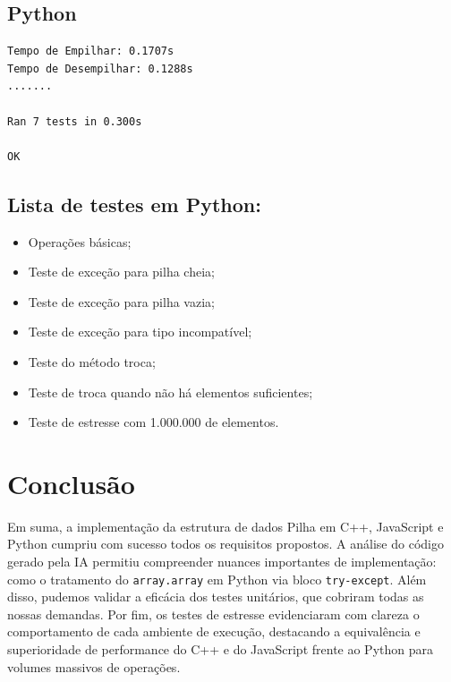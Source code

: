 \documentclass[12pt,a4paper]{article}
\begin{document}
\subsection*{Python}
\begin{verbatim}
Tempo de Empilhar: 0.1707s
Tempo de Desempilhar: 0.1288s
.......

Ran 7 tests in 0.300s

OK
\end{verbatim}

\subsection*{Lista de testes em Python:}
\begin{itemize}
    \item Operações básicas;
    \item Teste de exceção para pilha cheia;
    \item Teste de exceção para pilha vazia;
    \item Teste de exceção para tipo incompatível;
    \item Teste do método troca;
    \item Teste de troca quando não há elementos suficientes;
    \item Teste de estresse com 1.000.000 de elementos.
\end{itemize}


\section{Conclusão}

Em suma, a implementação da estrutura de dados Pilha em C++, JavaScript e Python cumpriu com sucesso todos os requisitos propostos. A análise do código gerado pela IA permitiu compreender nuances importantes de implementação: como o tratamento do \texttt{array.array} em Python via bloco \texttt{try-except}. Além disso, pudemos validar a eficácia dos testes unitários, que cobriram todas as nossas demandas. Por fim, os testes de estresse evidenciaram com clareza o comportamento de cada ambiente de execução, destacando a equivalência e superioridade de performance do C++ e do JavaScript frente ao Python para volumes massivos de operações. 
\end{document}
